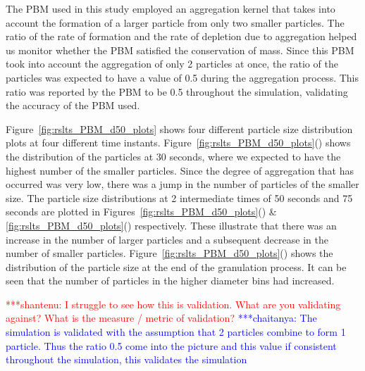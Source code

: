 \documentclass[preprint,11pt,authoryear]{elsarticle}
\newcommand{\jhanote}[1]{ {\textcolor{red} { ***shantenu: #1 }}}
\newcommand{\csnote}[1]{ {\textcolor{blue} { ***chaitanya: #1 }}}
\newcommand{\jhanote}[1]{ {\textcolor{red} { ***shantenu: #1 }}}
\newcommand{\csnote}[1]{}
\begin{document}
The PBM used in this study employed an aggregation kernel that takes into
account the formation of a larger particle from only two smaller particles.
The ratio of the rate of formation and the rate of depletion due to
aggregation helped us monitor whether the PBM satisfied the conservation of
mass. Since this PBM took into account the aggregation of only 2 particles at
once, the ratio of the particles was expected to have a value of 0.5 during
the aggregation process. This ratio was reported by the PBM to be 0.5
throughout the simulation, validating the accuracy of the PBM used.

Figure~\ref{fig:rslts_PBM_d50_plots} shows four different particle size
distribution plots at four different time instants.
Figure~\ref{fig:rslts_PBM_d50_plots}() shows the distribution
of the particles at 30 seconds, where we expected to have the highest number
of the smaller particles. Since the degree of aggregation that has occurred
was very low, there was a jump in the number of particles of the smaller size.
The particle size distributions at 2 intermediate times of 50 seconds and 75
seconds are plotted in Figures~\ref{fig:rslts_PBM_d50_plots}()
\& \ref{fig:rslts_PBM_d50_plots}() respectively. These
illustrate that there was an increase in the number of larger particles  and a
subsequent decrease in the number of smaller particles.
Figure~\ref{fig:rslts_PBM_d50_plots}() shows the distribution
of the particle size at the end of the granulation process. It can be seen
that the number of particles in the higher diameter bins had increased.

\jhanote{I struggle to see how this is validation. What are you validating
against? What is the measure / metric of validation?}
\csnote{The simulation is validated with the assumption that 2 particles combine 
to form 1 particle. Thus the ratio 0.5 come into the picture and this value if consistent
throughout the simulation, this validates the simulation}
\end{document}
